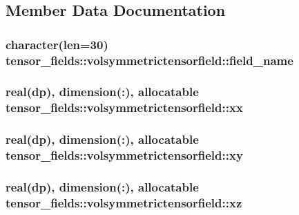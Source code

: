 \subsection{Member Data Documentation}
\hypertarget{structtensor__fields_1_1volsymmetrictensorfield_a4cb8f5abf82bc3c677309492a7caf4a8}{
\subsubsection[{field\-\_\-name}]{\setlength{\rightskip}{0pt plus 5cm}character(len=30) tensor\-\_\-fields\-::volsymmetrictensorfield\-::field\-\_\-name}}\label{structtensor__fields_1_1volsymmetrictensorfield_a4cb8f5abf82bc3c677309492a7caf4a8}
\hypertarget{structtensor__fields_1_1volsymmetrictensorfield_a7f12df8006b80670a00787a85cf6abd0}{
\subsubsection[{xx}]{\setlength{\rightskip}{0pt plus 5cm}real(dp), dimension(\-:), allocatable tensor\-\_\-fields\-::volsymmetrictensorfield\-::xx}}\label{structtensor__fields_1_1volsymmetrictensorfield_a7f12df8006b80670a00787a85cf6abd0}
\hypertarget{structtensor__fields_1_1volsymmetrictensorfield_abd016b0ab1652f8e3ae3197a2ec4f81f}{
\subsubsection[{xy}]{\setlength{\rightskip}{0pt plus 5cm}real(dp), dimension(\-:), allocatable tensor\-\_\-fields\-::volsymmetrictensorfield\-::xy}}\label{structtensor__fields_1_1volsymmetrictensorfield_abd016b0ab1652f8e3ae3197a2ec4f81f}
\hypertarget{structtensor__fields_1_1volsymmetrictensorfield_aa92ad13ff22457f916d2bfb25fad0716}{
\subsubsection[{xz}]{\setlength{\rightskip}{0pt plus 5cm}real(dp), dimension(\-:), allocatable tensor\-\_\-fields\-::volsymmetrictensorfield\-::xz}}\label{structtensor__fields_1_1volsymmetrictensorfield_aa92ad13ff22457f916d2bfb25fad0716}
